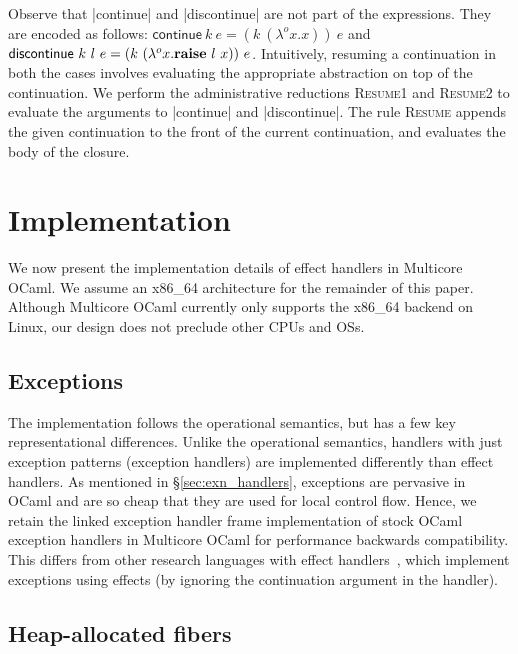 \documentclass[sigplan,10pt,review,anonymous]{acmart}\settopmatter{printfolios=true,printccs=false,printacmref=false}
\newcommand{\olam}[2]{\lambda^o #1. #2}
\newcommand{\kw}[1]{\text{\bf #1}}
\newcommand{\throw}[2]{\kw{raise} ~#1 ~#2}
\begin{document}
Observe that |continue| and |discontinue| are not part of the expressions. They
are encoded as follows: $\textsf{continue} ~k ~e = (k ~(\olam{x}{x})) ~e$ and
$\textsf{discontinue} ~k ~l ~e = (k ~(\olam{x}{\throw{l}{x}})) ~e$.
Intuitively, resuming a continuation in both the cases involves evaluating the
appropriate abstraction on top of the continuation. We perform the
administrative reductions \textsc{Resume1} and \textsc{Resume2} to evaluate the
arguments to |continue| and |discontinue|. The rule \textsc{Resume} appends the
given continuation to the front of the current continuation, and evaluates the
body of the closure.

\section{Implementation}
\label{sec:impl}

We now present the implementation details of effect handlers in Multicore
OCaml. We assume an x86\_64 architecture for the remainder of this paper.
Although Multicore OCaml currently only supports the x86\_64 backend on Linux,
our design does not preclude other CPUs and OSs.

\vspace{-2mm}
\subsection{Exceptions}

The implementation follows the operational semantics, but has a few key
representational differences. Unlike the operational semantics, handlers with
just exception patterns (exception handlers) are implemented differently than
effect handlers. As mentioned in \S\ref{sec:exn_handlers}, exceptions are
pervasive in OCaml and are so cheap that they are used for local control flow.
Hence, we retain the linked exception handler frame implementation of stock
OCaml exception handlers in Multicore OCaml for performance backwards
compatibility. This differs from other research languages with effect
handlers~\cite{Hillerstrom20,Frank,Eff}, which implement exceptions using
effects (by ignoring the continuation argument in the handler).

\vspace{-2mm}
\subsection{Heap-allocated fibers}
\label{sec:hafibers}
\end{document}
